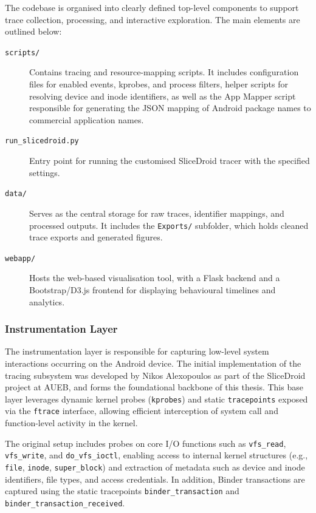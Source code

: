\documentclass[a4paper,12pt]{report}
\begin{document}
The codebase is organised into clearly defined top-level components to support trace collection, processing, and interactive exploration. The main elements are outlined below:

\begin{description}
  \item[\texttt{scripts/}] Contains tracing and resource-mapping scripts. It includes configuration files for enabled events, kprobes, and process filters, helper scripts for resolving device and inode identifiers, as well as the App Mapper script responsible for generating the JSON mapping of Android package names to commercial application names.

  \item[\texttt{run\_slicedroid.py}] Entry point for running the customised SliceDroid tracer with the specified settings.

  \item[\texttt{data/}] Serves as the central storage for raw traces, identifier mappings, and processed outputs. It includes the \texttt{Exports/} subfolder, which holds cleaned trace exports and generated figures.

  \item[\texttt{webapp/}] Hosts the web-based visualisation tool, with a Flask backend and a Bootstrap/D3.js frontend for displaying behavioural timelines and analytics.
\end{description}

\subsubsection{Instrumentation Layer}

The instrumentation layer is responsible for capturing low-level system interactions occurring on the Android device. The initial implementation of the tracing subsystem was developed by Nikos Alexopoulos as part of the SliceDroid project at AUEB, and forms the foundational backbone of this thesis. This base layer leverages dynamic kernel probes (\texttt{kprobes}) and static \texttt{tracepoints} exposed via the \texttt{ftrace} interface, allowing efficient interception of system call and function-level activity in the kernel.

The original setup includes probes on core I/O functions such as \texttt{vfs\_read}, \\ \texttt{vfs\_write}, and \texttt{do\_vfs\_ioctl}, enabling access to internal kernel structures (e.g., \texttt{file}, \texttt{inode}, \texttt{super\_block}) and extraction of metadata such as device and inode identifiers, file types, and access credentials. In addition, Binder transactions are captured using the static tracepoints \texttt{binder\_transaction} and \texttt{binder\_transaction\_received}.
\end{document}
